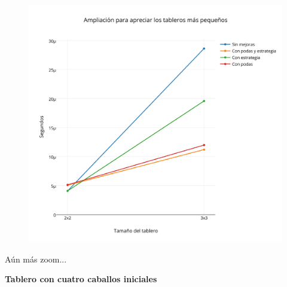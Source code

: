  \begin{figure}[h!]
   \begin{center}
   \includegraphics[scale=0.18]{../src/ej3/Mediciones/2caballos/promedios3.png} 
   \end{center}
 \end{figure}
 
A\'un m\'as zoom...

 \begin{figure}[h!]
   \begin{center}
   \end{center}
 \end{figure}
 
 \newpage
 
\textbf{{\Large Tablero con cuatro caballos iniciales}}

